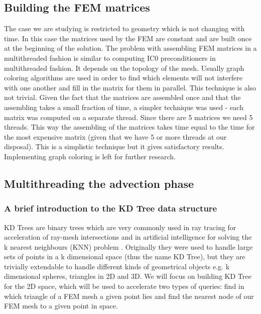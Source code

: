 \subsection{Building the FEM matrices}
The case we are studying is restricted to geometry which is not changing with time. In this case the matrices used by the FEM are constant and are built once at the beginning of the solution. The problem with assembling FEM matrices in a multithreaded fashion is similar to computing IC0 preconditioners in multithreaded fashion. It depends on the topology of the mesh. Usually graph coloring algorithms are used in order to find which elements will not interfere with one another and fill in the matrix for them in parallel. This technique is also not trivial. Given the fact that the matrices are assembled once and that the assembling takes a small fraction of time, a simpler technique was used - each matrix was computed on a separate thread. Since there are 5 matrices we need 5 threads. This way the assembling of the matrices takes time equal to the time for the most expensive matrix (given that we have 5 or more threads at our disposal). This is a simplistic technique but it gives satisfactory results. Implementing graph coloring is left for further research.

\subsection{Multithreading the advection phase}\label{sec:mt-advection}
\subsubsection{A brief introduction to the KD Tree data structure}
KD Trees are binary trees which are very commonly used in ray tracing for acceleration of ray-mesh intersections \cite{pbrt} and in artificial intelligence for solving the k nearest neighbours (KNN) problem \cite{knn-ai}. Originally they were used to handle large sets of points in a k dimensional space (thus the name KD Tree), but they are trivially extendable to handle different kinds of geometrical objects e.g. k dimensional spheres, triangles in 2D and 3D. We will focus on building KD Tree for the 2D space, which will be used to accelerate two types of queries: find in which triangle of a FEM mesh a given point lies and find the nearest node of our FEM mesh to a given point in space.

